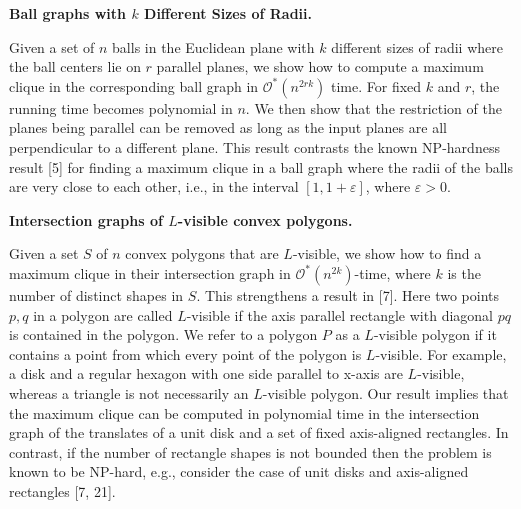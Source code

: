 \documentclass[10pt,a4paper]{amsart}
\begin{document}
\par
\par
\par
\par\medskip\noindent\textbf{Ball graphs with $k$ Different Sizes of Radii.}\par
Given a set of $n$ balls in the Euclidean plane with $k$ different sizes of radii where the ball centers lie on $r$ parallel planes, we show how to compute a maximum clique in the corresponding ball graph in $\mathcal{O}^{*}(n^{2rk})$ time. For fixed $k$ and $r$, the running time becomes polynomial in $n$. We then show that the restriction of the planes being parallel can be removed as long as the input planes are all perpendicular to a different plane. This result contrasts the known NP-hardness result [5] for finding a maximum clique in a ball graph where the radii of the balls are very close to each other, i.e., in the interval $[1,1+\varepsilon]$, where $\varepsilon>0$.
\par
\par
\par
\par\medskip\noindent\textbf{Intersection graphs of $L$-visible convex polygons.}\par
Given a set $S$ of $n$ convex polygons that are $L$-visible, we show how to find a maximum clique in their intersection graph in $\mathcal{O}^{*}(n^{2k})$-time, where $k$ is the number of distinct shapes in $S$. This strengthens a result in [7]. Here two points $p,q$ in a polygon are called $L$-visible if the axis parallel rectangle with diagonal $pq$ is contained in the polygon. We refer to a polygon $P$ as a $L$-visible polygon if it contains a point from which every point of the polygon is $L$-visible. For example, a disk and a regular hexagon with one side parallel to x-axis are $L$-visible, whereas a triangle is not necessarily an $L$-visible polygon. Our result implies that the maximum clique can be computed in polynomial time in the intersection graph of the translates of a unit disk and a set of fixed axis-aligned rectangles. In contrast, if the number of rectangle shapes is not bounded then the problem is known to be NP-hard, e.g., consider the case of unit disks and axis-aligned rectangles [7, 21].
\par
\par
\par
\par
\end{document}
